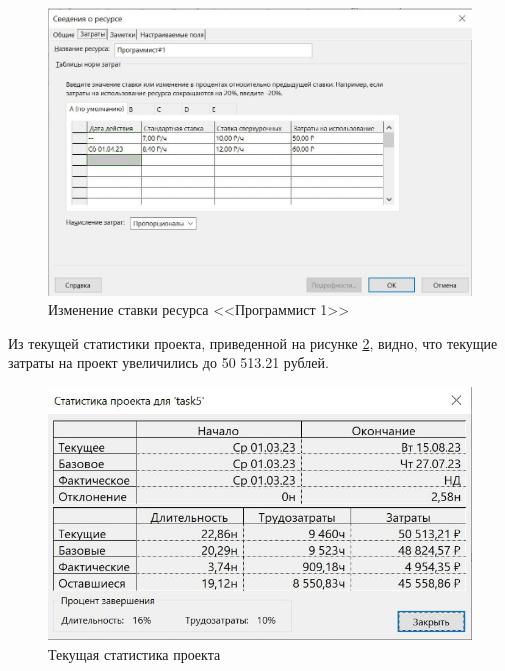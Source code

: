 \begin{figure}[H]
	\begin{center}
		\includegraphics[scale=0.3]{inc/img/task5.jpg}
	\end{center}
	\captionsetup{justification=centering}
	\caption{Изменение ставки ресурса <<Программист 1>>}
	\label{img:task5}
\end{figure}

Из текущей статистики проекта, приведенной на рисунке \ref{img:task5-stat}, видно, что текущие затраты на проект увеличились до 50 513.21 рублей.

\begin{figure}[H]
	\begin{center}
		\includegraphics[scale=0.3]{inc/img/task5-stat.jpg}
	\end{center}
	\captionsetup{justification=centering}
	\caption{Текущая статистика проекта}
	\label{img:task5-stat}
\end{figure}

